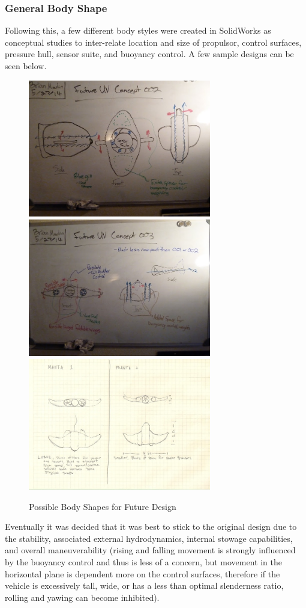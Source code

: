 \documentclass{report}
\begin{document}
\subsubsection{General Body Shape}
Following this, a few different body styles were created in SolidWorks as conceptual studies to inter-relate location and size of propulsor, control surfaces, pressure hull, sensor suite, and buoyancy control.  A few sample designs can be seen below.
\begin{figure}[H]
\centering
\includegraphics[width=8cm]{future2}
\includegraphics[width=8cm]{future3}
\includegraphics[width=8cm]{manta}
\caption{Possible Body Shapes for Future Design}
\end{figure}
Eventually it was decided that it was best to stick to the original design due to the stability, associated external hydrodynamics, internal stowage capabilities, and overall maneuverability (rising and falling movement is strongly influenced by the buoyancy control and thus is less of a concern, but movement in the horizontal plane is dependent more on the control surfaces, therefore if the vehicle is excessively tall, wide, or has a less than optimal slenderness ratio, rolling and yawing can become inhibited).
\end{document}
